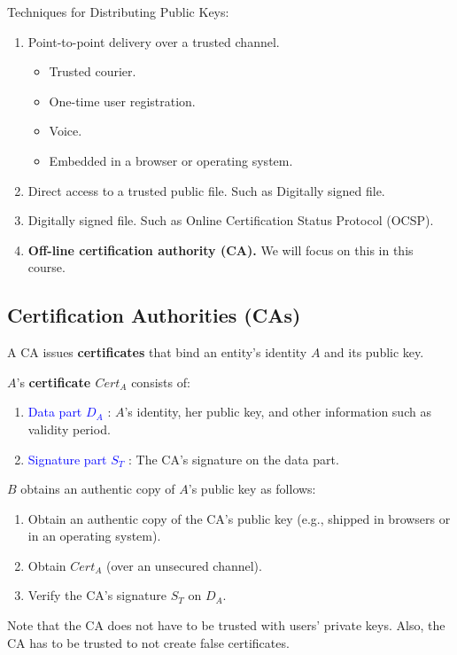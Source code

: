 \documentclass[12pt,titlepage]{article}
\begin{document}
Techniques for Distributing Public Keys: \begin{enumerate}
	\item Point-to-point delivery over a trusted channel.\begin{itemize}
		\item Trusted courier.
		\item One-time user registration.
		\item Voice.
		\item Embedded in a browser or operating system.
	\end{itemize}
	\item Direct access to a trusted public file. Such as Digitally signed file.
	\item Digitally signed file. Such as Online Certification Status Protocol (OCSP).
	\item \textbf{Off-line certification authority (CA).} We will focus on this in this course. 
\end{enumerate}
\subsection{Certification Authorities (CAs)}
A CA issues \textbf{certificates} that bind an entity’s identity $A$ and its public key.

$A$’s \textbf{certificate $Cert_A$} consists of:\begin{enumerate}
	\item \textcolor{blue}{Data part $D_A$} : $A$'s identity, her public key, and other information such as validity period.
	\item \textcolor{blue}{Signature part $S_T$} : The CA’s signature on the data part.
\end{enumerate}

$B$ obtains an authentic copy of $A$’s public key as follows:\begin{enumerate}
	\item Obtain an authentic copy of the CA’s public key (e.g., shipped in browsers or in an operating system).
	\item Obtain $Cert_A$ (over an unsecured channel).
	\item Verify the CA’s signature $S_T$ on $D_A$.
\end{enumerate}
Note that the CA does not have to be trusted with users’ private keys. Also, the CA has to be trusted to not create false certificates.
\end{document}
